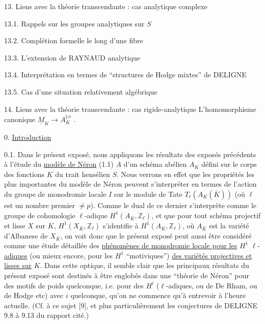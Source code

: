13. Liens avec la théorie transcendante : cas analytique complexe

13.1. Rappels sur les groupes analytiques sur $S$

13.2. Complétion formelle le long d'une fibre

13.3. L'extension de RAYNAUD analytique

13.4. Interprétation en termes de ``structures de Hodge mixtes'' de DELIGNE

13.5. Cas d'une situation relativement algébrique

14. Liens avec la théorie transcendante : cas rigide-analytique L'homomorphisme canonique $\underline{M}_K \longrightarrow A_K^{\natural\,o}$ .


0. \underline{Introduction}

0.1. Dans le présent exposé, nous appliquons les résultats des exposés précédents à l'étude du \underline{modèle de Néron} (1.1) $A$ d'un schéma abélien $A_K$ défini sur le corps des fonctions $K$ du trait hensélien $S$. Nous verrons en effet que les propriétés les plus importantes du modèle de Néron peuvent s'interpréter en termes de l'action du groupe de monodromie locale $I$ sur le module de Tate $T_\ell(A_K(\overline{K}))$ (où $\ell$ est un nombre premier $\neq p$). Comme le dual de ce dernier s'interprète comme le groupe de cohomologie $\ell$-adique $H^1(A_{\overline{K}},\mathbb{Z}_\ell)$, et que pour tout schéma projectif et lisse $X$ sur $K$, $H^1(X_{\overline{K}},\mathbb{Z}_\ell)$ s'identifie à $H^1(A_{\overline{K}},\mathbb{Z}_\ell)$, où $A_{\overline{K}}$ est la variété d'Albanese de $X_{\overline{K}}$, on voit donc que le présent exposé peut aussi être considéré comme une étude détaillée des \underline{phénomènes de monodromie locale pour les} $H^1$ $\ell$-\underline{adiques} (ou mieux encore, pour les $H^1$ ``motiviques'') \underline{des variétés projectives et lisses sur} $K$. Dans cette optique, il semble clair que les principaux résultats du présent exposé sont destinés à être englobés dans une ``théorie de Néron'' pour des motifs de poids quelconque, i.e. pour des $H^i$ ($\ell$-adiques, ou de De Rham, ou de Hodge etc) avec $i$ quelconque, qu'on ne commence qu'à entrevoir à l'heure actuelle. (Cf. à ce sujet [9], et plus particulièrement les conjectures de DELIGNE 9.8 à 9.13 du rapport cité.)




